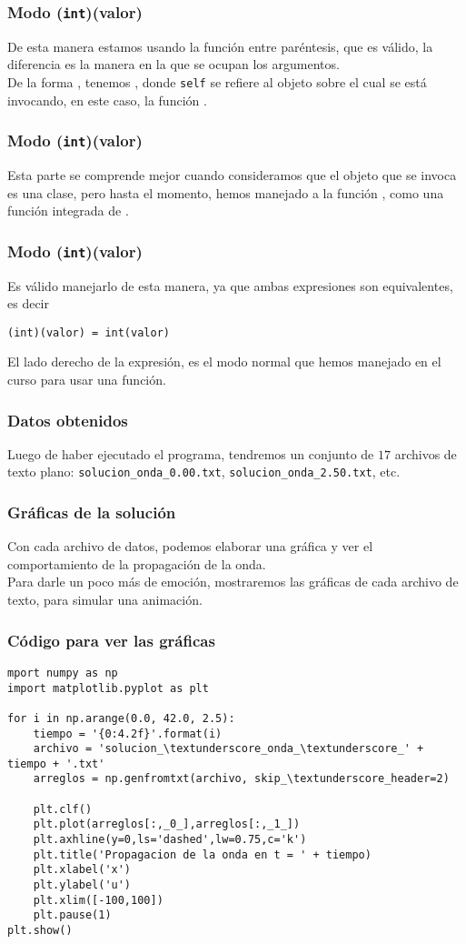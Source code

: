\begin{frame}
\frametitle{Modo (\texttt{int})(valor)}
De esta manera estamos usando la función  entre paréntesis, que es válido, la diferencia es la manera en la que se ocupan los argumentos.
\\
\bigskip
De la forma , tenemos , donde \texttt{self} se refiere al objeto sobre el cual se está invocando, en este caso, la función .
\end{frame}
\begin{frame}
\frametitle{Modo (\texttt{int})(valor)}
Esta parte se comprende mejor cuando consideramos que el objeto que se invoca es una clase, pero hasta el momento, hemos manejado a la función , como una función integrada de \python.
\end{frame}
\begin{frame}[fragile]
\frametitle{Modo (\texttt{int})(valor)}
Es válido manejarlo de esta manera, ya que ambas expresiones son equivalentes, es decir
\begin{verbatim}
(int)(valor) = int(valor)
\end{verbatim}
El lado derecho de la expresión, es el modo normal que hemos manejado en el curso para usar una función.
\end{frame}
\begin{frame}
\frametitle{Datos obtenidos}
Luego de haber ejecutado el programa, tendremos un conjunto de $17$ archivos de texto plano: \texttt{solucion\_onda\_0.00.txt}, \texttt{solucion\_onda\_2.50.txt}, etc.
\end{frame}
\begin{frame}
\frametitle{Gráficas de la solución}
Con cada archivo de datos, podemos elaborar una gráfica y ver el comportamiento de la propagación de la onda.
\\
\bigskip
Para darle un poco más de emoción, mostraremos las gráficas de cada archivo de texto, para simular una animación.
\end{frame}
\begin{frame}
\frametitle{Código para ver las gráficas}
\begin{lstlisting}[caption=Código para mostrar las gráficas, style=FormattedNumber, basicstyle=\linespread{1.1}\ttfamily=\small, columns=fullflexible]
mport numpy as np
import matplotlib.pyplot as plt

for i in np.arange(0.0, 42.0, 2.5):
    tiempo = '{0:4.2f}'.format(i)
    archivo = 'solucion_\textunderscore_onda_\textunderscore_' + tiempo + '.txt'
    arreglos = np.genfromtxt(archivo, skip_\textunderscore_header=2)
    
    plt.clf()
    plt.plot(arreglos[:,_0_],arreglos[:,_1_])
    plt.axhline(y=0,ls='dashed',lw=0.75,c='k')
    plt.title('Propagacion de la onda en t = ' + tiempo)
    plt.xlabel('x')
    plt.ylabel('u')
    plt.xlim([-100,100])
    plt.pause(1)
plt.show()
\end{lstlisting}
\end{frame}
